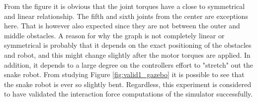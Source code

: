 From the figure it is obvious that the joint torques have a close to symmetrical and linear relationship. The fifth and sixth joints from the center are exceptions here. That is however also expected since they are not between the outer and middle obstacles. A reason for why the graph is not completely linear or symmetrical is probably that it depends on the exact positioning of the obstacles and robot, and this might change slightly after the motor torques are applied. In addition, it depends to a large degree on the controllers effort to "stretch" out the snake robot. From studying Figure \ref{fig:valid1_gazebo} it is possible to see that the snake robot is ever so slightly bent.
Regardless, this experiment is considered to have validated the interaction force computations of the simulator successfully. 